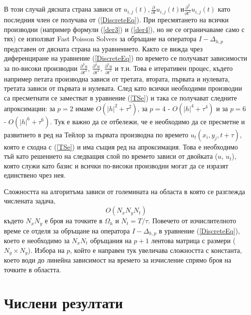 \documentclass{article}
\newcommand{\rf}[1]{(\ref{#1})}
\begin{document}
В този случай дясната страна зависи от $u_{i, j}(t), \frac{\partial}{\partial t}u_{i, j}(t) и \frac{\partial^2}{\partial t^2}u_{i, j}(t)$ като последния член се получава от \rf{DiscreteEq}. При пресмятането на всички производни (например формули \rf{der3} и \rf{der4}, но не се ограничаваме само с тях) се използват Fast Poisson Solvers за обръщане на оператора $I-\Delta_{h,p}$ представен от дясната страна на уравнението. Както се вижда чрез диференциране на уравнение \rf{DiscreteEq} по времето се получават зависимости за по-високи производни $\frac{\partial^3 u}{\partial t^3}$, $\frac{\partial^4 u}{\partial t^4}$, $\frac{\partial^5 u}{\partial t^5}$ и т.н. Това е итеративен процес, където например петата производна зависи от третата, втората, първата и нулевата, третата зависи от първата и нулевата. След като всички необходими производни са пресметнати се заместват в уравнение \rf{TSe} и така се получават следните апроксимации: за $p=2$ имаме $O(|h|^2 + \tau^2)$, за $p=4$ - $O(|h|^4 + \tau^4)$ и за $p=6$ - $O(|h|^6 + \tau^6)$. Тук е важно да се отбележи, че е необходимо да се пресметне и развитието в ред на Тейлор за първата производна по времето $u_t(x_i, y_j, t+\tau)$, която е сходна с \rf{TSe} и има същия ред на апроксимация. Това е необходимо тъй като решението на следващия слой по времето зависи от двойката ($u$, $u_t$), която служи като базис и всички по-високи производни могат да се изразят единствено чрез нея.

Сложността на алгоритъма зависи от големината на областа в която се разглежда числената задача,
$$ O( N_x N_y N_t ) $$
където $N_x N_y$ е броя на точките в $\Omega_h$ и $N_t = T/\tau$. Повечето от изчислителното време се отделя за обръщане на оператора $I-\Delta_{h,p}$ в уравнение \rf{DiscreteEq}, което е необходимо за $N_x N_t$ обръщания на $p+1$ лентова матрица с размери ($N_y \times N_y$). Избора на $p$, който е направен тук увеличава сложността с константа, което води до линейна зависимост на времето за изчисление спрямо броя на точките в областта. 

\section{Числени резултати}
\end{document}
